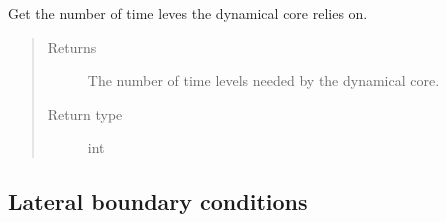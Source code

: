 \documentclass[letterpaper,10pt,english]{sphinxmanual}
\begin{document}
\begin{fulllineitems}
\begin{fulllineitems}
\begin{quote}
\begin{description}
\end{description}\end{quote}

\end{fulllineitems}


\begin{fulllineitems}
\label{\detokenize{api:dycore.dycore_isentropic.DynamicalCoreIsentropic.time_levels}}
Get the number of time leves the dynamical core relies on.
\begin{quote}\begin{description}
\item[{Returns}] \leavevmode
The number of time levels needed by the dynamical core.

\item[{Return type}] \leavevmode
int

\end{description}\end{quote}

\end{fulllineitems}


\end{fulllineitems}



\subsection{Lateral boundary conditions}
\label{\detokenize{api:lateral-boundary-conditions}}
\end{document}
